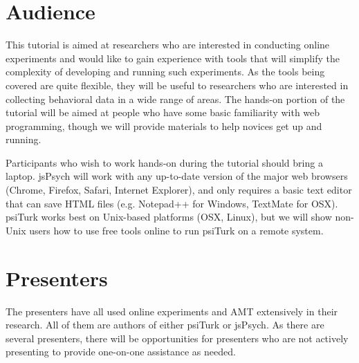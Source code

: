 \documentclass[10pt,letterpaper]{article}
\begin{document}
\section{Audience}

This tutorial is aimed at researchers who are interested in conducting online experiments and would like to gain experience with tools that will simplify the complexity of developing and running such experiments. As the tools being covered are quite flexible, they will be useful to researchers who are interested in collecting behavioral data in a wide range of areas. The hands-on portion of the tutorial will be aimed at people who have some basic familiarity with web programming, though we will provide materials to help novices get up and running. 

Participants who wish to work hands-on during the tutorial should bring a laptop. jsPsych will work with any up-to-date version of the major web browsers (Chrome, Firefox, Safari, Internet Explorer), and only requires a basic text editor that can save HTML files (e.g. Notepad++ for Windows, TextMate for OSX). psiTurk works best on Unix-based platforms (OSX, Linux), but we will show non-Unix users how to use free tools online to run psiTurk on a remote system.

\section{Presenters}

The presenters have all used online experiments and AMT extensively in their research. All of them are authors of either psiTurk or jsPsych. As there are several presenters, there will be opportunities for presenters who are not actively presenting to provide one-on-one assistance as needed. 



\setlength{\bibleftmargin}{.125in}
\setlength{\bibindent}{-\bibleftmargin}


\end{document}
